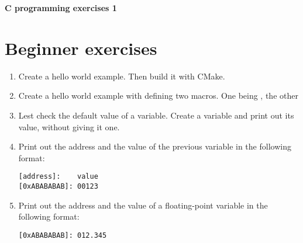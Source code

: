\documentclass[12pt,a4paper]{article}
\author{Korcsák Gergely}
\begin{document}
    \setcounter{page}{1} %
    \setalgorithmcounter %

	{
        \centering
        {\Large \textbf{C programming exercises 1} }\\ \vspace{.5em}\hline
		\vspace{2em}
	}


    \section{Beginner exercises}
    \begin{enumerate}
        \item Create a hello world example. Then build it with CMake.
        \item Create a hello world example with defining two macros. One being , the other 
        \item Lest check the default value of a variable. Create a variable and print out its value, without giving it one.
        \item Print out the address and the value of the previous variable in the following format:
              \begin{lstlisting}[style=CStyle]
[address]:    value
[0xABABABAB]: 00123
\end{lstlisting}
        \item Print out the address and the value of a floating-point variable in the following format:
              \begin{lstlisting}[style=CStyle]
[0xABABABAB]: 012.345
\end{lstlisting}
    \end{enumerate}
\end{document}

